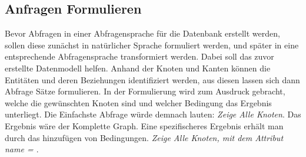 \subsection{Anfragen Formulieren}

Bevor Abfragen in einer Abfragensprache für die Datenbank erstellt werden, sollen diese zunächst in natürlicher Sprache formuliert werden, und später in eine entsprechende Abfragensprache  transformiert werden. Dabei soll das zuvor erstellte  Datenmodell helfen. Anhand der Knoten und Kanten können die Entitäten und deren Beziehungen identifiziert werden, aus diesen lassen sich dann Abfrage Sätze formulieren. In der Formulierung wird zum Ausdruck gebracht, welche die gewünschten Knoten sind und welcher Bedingung das Ergebnis unterliegt. Die Einfachste Abfrage würde demnach lauten: \textit{Zeige Alle Knoten}. Das Ergebnis wäre der Komplette Graph. Eine spezifischeres Ergebnis erhält man durch das hinzufügen von Bedingungen. \newline \textit{  Zeige Alle Knoten, mit dem Attribut {name = \textbf{\texttt{}}}}. 


